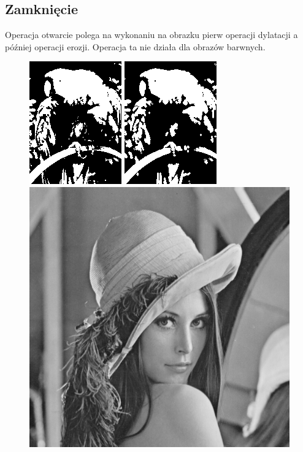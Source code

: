 \documentclass{article}
\begin{document}
\subsection{Zamknięcie}
Operacja otwarcie polega na wykonaniu na obrazku pierw operacji dylatacji a później operacji erozji. Operacja ta nie działa dla obrazów barwnych.
\begin{figure}[!htb]
\centering
\includegraphics[scale=0.6]{img/papuga_1bit.png} 
\includegraphics[scale=0.6]{img/Zamkniecie_Obrazu_papuga_1bit.png}\\
\includegraphics[scale=0.2]{img/lena_8bit.png}  

\end{figure}
\end{document}
